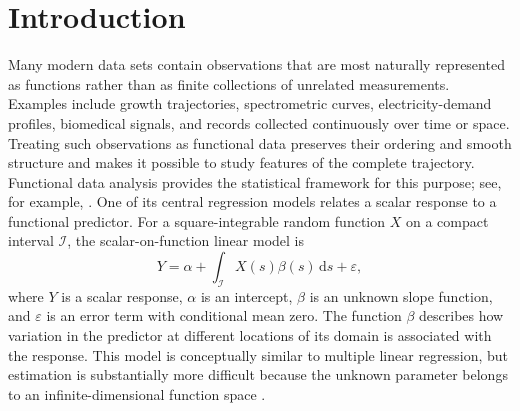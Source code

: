 \chapter{Introduction}
\label{chap:introduction}

Many modern data sets contain observations that are most naturally represented as functions rather than as finite collections of unrelated measurements. Examples include growth trajectories, spectrometric curves, electricity-demand profiles, biomedical signals, and records collected continuously over time or space. Treating such observations as functional data preserves their ordering and smooth structure and makes it possible to study features of the complete trajectory. Functional data analysis provides the statistical framework for this purpose; see, for example, \textcite{ramsay_silverman_2005}. One of its central regression models relates a scalar response to a functional predictor. For a square-integrable random function $X$ on a compact interval $\mathcal{I}$, the scalar-on-function linear model is
\begin{equation}
    Y = \alpha + \int_{\mathcal{I}} X(s)\beta(s)\,\mathrm{d}s + \varepsilon,
    \label{eq:intro-functional-linear-model}
\end{equation}
where $Y$ is a scalar response, $\alpha$ is an intercept, $\beta$ is an unknown slope function, and $\varepsilon$ is an error term with conditional mean zero. The function $\beta$ describes how variation in the predictor at different locations of its domain is associated with the response. This model is conceptually similar to multiple linear regression, but estimation is substantially more difficult because the unknown parameter belongs to an infinite-dimensional function space \parencite{cardot_ferraty_sarda_1999,hall_horowitz_2007}.

